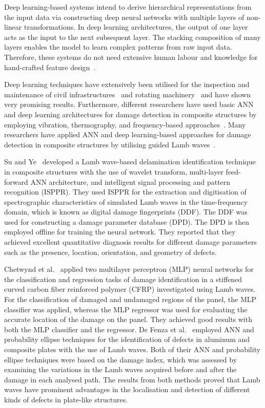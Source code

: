 Deep learning-based systems intend to derive hierarchical representations from the input data via constructing deep neural networks with multiple layers of non-linear transformations.
In deep learning architectures, the output of one layer acts as the input to the next subsequent layer.
The stacking composition of many layers enables the model to learn complex patterns from raw input data.
Therefore, these systems do not need extensive human labour and knowledge for hand-crafted feature design~\cite{Zhao2019b}. %

Deep learning techniques have extensively been utilised for the inspection and maintenance of civil infrastructures~\cite{cha2017deep, Lin2017a, Liu2019} and rotating machinery~\cite{janssens2016convolutional, Jia2016a} and have shown very promising results.
Furthermore, different researchers have used basic ANN and deep learning architectures for damage detection in composite structures by employing vibration, thermography, and frequency-based approaches~\cite{chakraborty2005artificial, Khan2019a, luo2019temporal, bang2020defect}. 
Many researchers have applied ANN and deep learning-based approaches for damage detection in composite structures by utilising guided Lamb waves~\cite{Su2004a, chetwynd2008damage, de2015application, feng2019locating, mardanshahi2020detection, qian2020application, Tabian2019, rautela2021ultrasonic}.

Su and Ye~\cite{Su2004a} developed a Lamb wave-based delamination identification technique in composite structures with the use of wavelet transform, multi-layer feed-forward ANN architecture, and intelligent signal processing and pattern recognition (ISPPR).
They used ISPPR for the extraction and digitisation of spectrographic characteristics of simulated Lamb waves in the time-frequency domain, which is known as digital damage fingerprints (DDF).
The DDF was used for constructing a damage parameter database (DPD). 
The DPD is then employed offline for training the neural network.
They reported that they achieved excellent quantitative diagnosis results for different damage parameters such as the presence, location, orientation, and geometry of defects.

Chetwynd et al.~\cite{chetwynd2008damage} applied two multilayer perceptron (MLP) neural networks for the classification and regression tasks of damage identification in a stiffened curved carbon fiber reinforced polymer (CFRP) investigated using Lamb waves.
For the classification of damaged and undamaged regions of the panel, the MLP classifier was applied, whereas the MLP regressor was used for evaluating the accurate location of the damage on the panel. 
They achieved good results with both the MLP classifier and the regressor.
De Fenza et al.~\cite{de2015application} employed ANN and probability ellipse techniques for the identification of defects in aluminum and composite plates with the use of Lamb waves.
Both of their ANN and probability ellipse techniques were based on the damage index, which was assessed by examining the variations in the Lamb waves acquired before and after the damage in each analysed path.
The results from both methods proved that Lamb waves have prominent advantages in the localisation and detection of different kinds of defects in plate-like structures.

